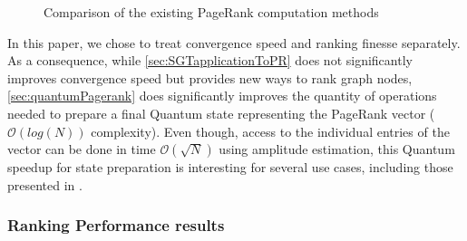\documentclass[sn-mathphys]{sn-jnl}%
\theoremstyle{thmstyleone}%
\theoremstyle{thmstyletwo}%
\theoremstyle{thmstylethree}%
\begin{document}
\begin{figure}\label{fig:pagerank_computation}
    \centering
    
    
    \caption{Comparison of the existing PageRank computation methods}
    \label{fig:pagerank_computation}
\end{figure}

In this paper, we chose to treat convergence speed and ranking finesse separately. As a consequence, while \ref{sec:SGTapplicationToPR} does not significantly improves convergence speed but provides new ways to rank graph nodes, \ref{sec:quantumPagerank} does significantly improves the quantity of operations needed to prepare a final Quantum state representing the PageRank vector ($\mathcal{O}(log(N))$ complexity). Even though, access to the individual entries of the vector can be done in time $\mathcal{O}(\sqrt{N})$ using amplitude estimation, this Quantum speedup for state preparation is interesting for several use cases, including those presented in \cite{garnerone_zanardi_lidar_2012}. 

\subsubsection{Ranking Performance results}
\end{document}
